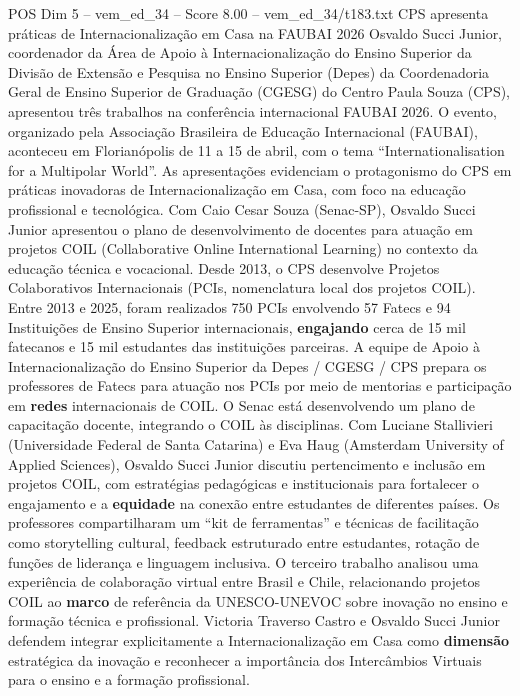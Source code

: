 \begin{textsample}{POS Dim 5 – vem\_ed\_34 – Score 8.00 – vem\_ed\_34/t183.txt}  \label{ex:f5_pos_003}
CPS apresenta práticas de Internacionalização em Casa na FAUBAI 2026 Osvaldo Succi Junior, coordenador da Área de Apoio à Internacionalização do Ensino Superior da Divisão de Extensão e Pesquisa no Ensino Superior (Depes) da Coordenadoria Geral de Ensino Superior de Graduação (CGESG) do Centro Paula Souza (CPS), apresentou três trabalhos na conferência internacional FAUBAI 2026.
O evento, organizado pela Associação Brasileira de Educação Internacional (FAUBAI), aconteceu em Florianópolis de 11 a 15 de abril, com o tema “Internationalisation for a Multipolar World”.
As apresentações evidenciam o protagonismo do CPS em práticas inovadoras de Internacionalização em Casa, com foco na educação profissional e tecnológica.
Com Caio Cesar Souza (Senac-SP), Osvaldo Succi Junior apresentou o plano de desenvolvimento de docentes para atuação em projetos COIL (Collaborative Online International Learning) no contexto da educação técnica e vocacional.
Desde 2013, o CPS desenvolve Projetos Colaborativos Internacionais (PCIs, nomenclatura local dos projetos COIL).
Entre 2013 e 2025, foram realizados 750 PCIs envolvendo 57 Fatecs e 94 Instituições de Ensino Superior internacionais, \textbf{engajando} cerca de 15 mil fatecanos e 15 mil estudantes das instituições parceiras.
A equipe de Apoio à Internacionalização do Ensino Superior da Depes / CGESG / CPS prepara os professores de Fatecs para atuação nos PCIs por meio de mentorias e participação em \textbf{redes} internacionais de COIL.
O Senac está desenvolvendo um plano de capacitação docente, integrando o COIL às disciplinas.
Com Luciane Stallivieri (Universidade Federal de Santa Catarina) e Eva Haug (Amsterdam University of Applied Sciences), Osvaldo Succi Junior discutiu pertencimento e inclusão em projetos COIL, com estratégias pedagógicas e institucionais para fortalecer o engajamento e a \textbf{equidade} na conexão entre estudantes de diferentes países.
Os professores compartilharam um “kit de ferramentas” e técnicas de facilitação como storytelling cultural, feedback estruturado entre estudantes, rotação de funções de liderança e linguagem inclusiva.
O terceiro trabalho analisou uma experiência de colaboração virtual entre Brasil e Chile, relacionando projetos COIL ao \textbf{marco} de referência da UNESCO-UNEVOC sobre inovação no ensino e formação técnica e profissional.
Victoria Traverso Castro e Osvaldo Succi Junior defendem integrar explicitamente a Internacionalização em Casa como \textbf{dimensão} estratégica da inovação e reconhecer a importância dos Intercâmbios Virtuais para o ensino e a formação profissional.

\end{textsample}

